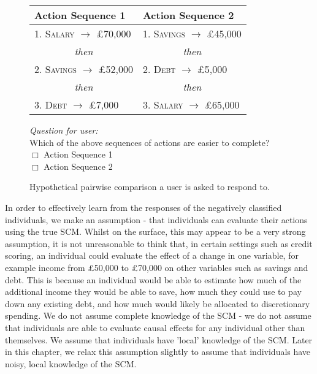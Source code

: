 \begin{figure}[!htb]
	\centering
	\begin{tabular}{l|l}
		\hline
		\textbf{Action Sequence 1} & \textbf{Action Sequence 2} \\
		\hline
		\textsc{1. Salary} $\to$ £70,000 & \textsc{1. Savings} $\to$ £45,000 \\
		\multicolumn{1}{c|}{\textit{then}} & \multicolumn{1}{c}{\textit{then}}\\
		\textsc{2. Savings} $\to$ £52,000 & \textsc{2. Debt} $\to$ £5,000 \\
		\multicolumn{1}{c|}{\textit{then}} & \multicolumn{1}{c}{\textit{then}}\\
		\textsc{3. Debt} $\to$ £7,000 & \textsc{3. Salary} $\to$ £65,000 \\ 
		\hline
	\end{tabular}
	
	\vspace{1.5em} %
	\parbox{\linewidth}{
		\centering
		\textit{Question for user:}\\
		Which of the above sequences of actions are easier to complete? \\
		$\Box$ Action Sequence 1 \\
		$\Box$ Action Sequence 2
	}
	
	\caption{Hypothetical pairwise comparison a user is asked to respond to.}
	\label{fig:comparison_ui}
\end{figure}

In order to effectively learn from the responses of the negatively classified individuals, we make an assumption - that individuals can evaluate their actions using the true SCM. Whilst on the surface, this may appear to be a very strong assumption, it is not unreasonable to think that, in certain settings such as credit scoring, an individual could evaluate the effect of a change in one variable, for example income from £50,000 to £70,000 on other variables such as savings and debt. This is because an individual would be able to estimate how much of the additional income they would be able to save, how much they could use to pay down any existing debt, and how much would likely be allocated to discretionary spending. We do not assume complete knowledge of the SCM - we do not assume that individuals are able to evaluate causal effects for any individual other than themselves. We assume that individuals have 'local' knowledge of the SCM. Later in this chapter, we relax this assumption slightly to assume that individuals have noisy, local knowledge of the SCM.


